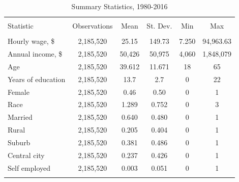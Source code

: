 \documentclass[notitlepage,12pt]{article}
\begin{document}
\begin{table}[!htbp] \centering 
  \caption{Summary Statistics, 1980-2016} 
  \label{} 
\begin{tabular}{@{\extracolsep{5pt}}lccccc} 
\\[-1.8ex]\hline 
\hline \\[-1.8ex] 
Statistic & \multicolumn{1}{c}{Observations} & \multicolumn{1}{c}{Mean} & \multicolumn{1}{c}{St. Dev.} & \multicolumn{1}{c}{Min} & \multicolumn{1}{c}{Max} \\ 
\hline \\[-1.8ex] 
Hourly wage, \$ & 2,185,520 & 25.15 & 149.73 & 7.250 & 94,963.63 \\  
Annual income, \$ & 2,185,520 & 50,426& 50,975 & 4,060 & 1,848,079 \\ 
Age & 2,185,520 & 39.612 & 11.671 & 18 & 65 \\ 
Years of education & 2,185,520 & 13.7 & 2.7 & 0 & 22 \\ 
Female & 2,185,520 & 0.46 & 0.50 & 0 & 1 \\ 
Race & 2,185,520 & 1.289 & 0.752 & 0 & 3 \\ 
Married & 2,185,520 & 0.640 & 0.480 & 0 & 1 \\ 
Rural & 2,185,520 & 0.205 & 0.404 & 0 & 1 \\ 
Suburb & 2,185,520 & 0.381 & 0.486 & 0 & 1 \\ 
Central city & 2,185,520 & 0.237 & 0.426 & 0 & 1 \\ 
Self employed & 2,185,520 & 0.003 & 0.051 & 0 & 1 \\ 
\hline \\[-1.8ex] 
\end{tabular} 
\end{table}
\end{document}
